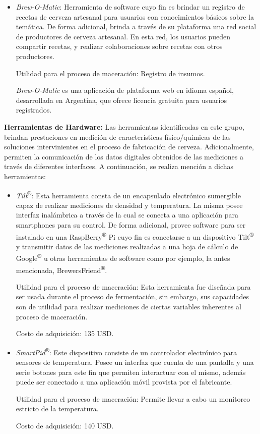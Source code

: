 \begin{itemize}
        \item{\textit{Brew-O-Matic}}: Herramienta de software cuyo fin es brindar un registro de recetas de cerveza artesanal para usuarios con conocimientos básicos sobre la temática. De forma adicional, brinda a través de su plataforma una red social de productores de cerveza artesanal. En esta red, los usuarios pueden compartir recetas, y realizar colaboraciones sobre recetas con otros productores.
        \par
        Utilidad para el proceso de maceración: Registro de insumos.
        \par
        \textit{Brew-O-Matic} es una aplicación de plataforma web en idioma español, desarrollada en Argentina, que ofrece licencia gratuita para usuarios registrados.
        
    \end{itemize}
    \par
    \textbf{Herramientas de Hardware:}
    Las herramientas identificadas en este grupo, brindan prestaciones en medición de características físico/químicas de las soluciones intervinientes en el proceso de fabricación de cerveza. Adicionalmente, permiten la comunicación de los datos digitales obtenidos de las mediciones a través de diferentes interfaces. A continuación, se realiza mención a dichas herramientas:
    \begin{itemize}
        \item \textit{Tilt}\textsuperscript{®}: Esta herramienta consta de un encapsulado electrónico sumergible capaz de realizar mediciones de densidad y temperatura. La misma posee interfaz inalámbrica a través de la cual se conecta a una aplicación para smartphones para su control. De forma adicional, provee software para ser instalado en una RaspBerry\textsuperscript{®} Pi cuyo fin es conectarse a un dispositivo Tilt\textsuperscript{®} y transmitir datos de las mediciones realizadas a una hoja de cálculo de Google\textsuperscript{®} u otras herramientas de software como por ejemplo, la antes mencionada,  BrewersFriend\textsuperscript{®}.
        \par
        Utilidad para el proceso de maceración: Esta herramienta fue diseñada para ser usada durante el proceso de fermentación, sin embargo, sus capacidades son de utilidad para realizar mediciones de ciertas variables inherentes al proceso de maceración.
        \par
        Costo de adquisición: 135 USD.
        
        \item{\textit{SmartPid}\textsuperscript{®}}: Este dispositivo consiste de un controlador electrónico para sensores de temperatura. Posee un interfaz que cuenta de una pantalla y una serie botones para este fin que permiten interactuar con el mismo, además puede ser conectado a una aplicación móvil provista por el fabricante.
        \par
        Utilidad para el proceso de maceración: Permite llevar a cabo un monitoreo estricto de la temperatura. 
        \par
        Costo de adquisición: 140 USD.
        
    \end{itemize}
